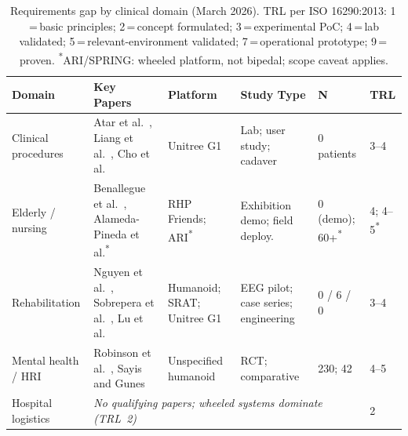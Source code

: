 \begin{table}[t]
  \caption{Requirements gap by clinical domain (March 2026). TRL per ISO
  16290:2013: 1\,=\,basic principles; 2\,=\,concept formulated;
  3\,=\,experimental PoC; 4\,=\,lab validated; 5\,=\,relevant-environment
  validated; 7\,=\,operational prototype; 9\,=\,proven.
  \textsuperscript{*}ARI/SPRING: wheeled platform, not bipedal; scope caveat applies.}
  \label{tab:evidence}
  \footnotesize
  \begin{tabular}{@{}p{2.1cm}p{2.1cm}p{2.0cm}p{1.4cm}p{1.1cm}l@{}}
    \toprule
    \textbf{Domain} & \textbf{Key Papers} & \textbf{Platform} & \textbf{Study Type} & \textbf{N} & \textbf{TRL} \\
    \midrule
    Clinical procedures &
      Atar et al.~\cite{atar2025humanoids}, Liang et al.~\cite{liang2025lapsurgie}, Cho et al.~\cite{cho2026humanoid} &
      Unitree G1 & Lab; user study; cadaver & 0 patients & 3--4 \\[3pt]
    Elderly / nursing &
      Benallegue et al.~\cite{benallegue2025rhp}, Alameda-Pineda et al.\textsuperscript{*}~\cite{alamedapineda2024spring} &
      RHP Friends; ARI\textsuperscript{*} & Exhibition demo; field deploy. &
      0 (demo); 60+\textsuperscript{*} & 4; 4--5\textsuperscript{*} \\[3pt]
    Rehabilitation &
      Nguyen et al.~\cite{nguyen2024eeg}, Sobrepera et al.~\cite{sobrepera2022feasibility}, Lu et al.~\cite{lu2025gentlehumanoid} &
      Humanoid; SRAT; Unitree G1 & EEG pilot; case series; engineering &
      0 / 6 / 0 & 3--4 \\[3pt]
    Mental health / HRI &
      Robinson et al.~\cite{robinson2023brief}, Sayis and Gunes~\cite{sayis2024technology} &
      Unspecified humanoid & RCT; comparative & 230; 42 & 4--5 \\[3pt]
    Hospital logistics & \multicolumn{4}{l}{\emph{No qualifying papers; wheeled systems dominate (TRL~2)}} & 2 \\
    \bottomrule
  \end{tabular}
\end{table}

